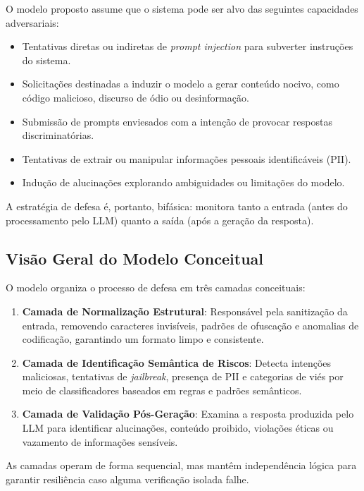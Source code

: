 O modelo proposto assume que o sistema pode ser alvo das seguintes capacidades adversariais:

\begin{itemize}
    \item Tentativas diretas ou indiretas de \textit{prompt injection} para subverter instruções do sistema.
    \item Solicitações destinadas a induzir o modelo a gerar conteúdo nocivo, como código malicioso, discurso de ódio ou desinformação.
    \item Submissão de prompts enviesados com a intenção de provocar respostas discriminatórias.
    \item Tentativas de extrair ou manipular informações pessoais identificáveis (PII).
    \item Indução de alucinações explorando ambiguidades ou limitações do modelo.
\end{itemize}

A estratégia de defesa é, portanto, bifásica: monitora tanto a entrada (antes do processamento pelo LLM) quanto a saída (após a geração da resposta).

\subsection{Visão Geral do Modelo Conceitual}

O modelo organiza o processo de defesa em três camadas conceituais:

\begin{enumerate}
    \item \textbf{Camada de Normalização Estrutural}: Responsável pela sanitização da entrada, removendo caracteres invisíveis, padrões de ofuscação e anomalias de codificação, garantindo um formato limpo e consistente.
    
    \item \textbf{Camada de Identificação Semântica de Riscos}: Detecta intenções maliciosas, tentativas de \textit{jailbreak}, presença de PII e categorias de viés por meio de classificadores baseados em regras e padrões semânticos.
    
    \item \textbf{Camada de Validação Pós-Geração}: Examina a resposta produzida pelo LLM para identificar alucinações, conteúdo proibido, violações éticas ou vazamento de informações sensíveis.
\end{enumerate}

As camadas operam de forma sequencial, mas mantêm independência lógica para garantir resiliência caso alguma verificação isolada falhe.

